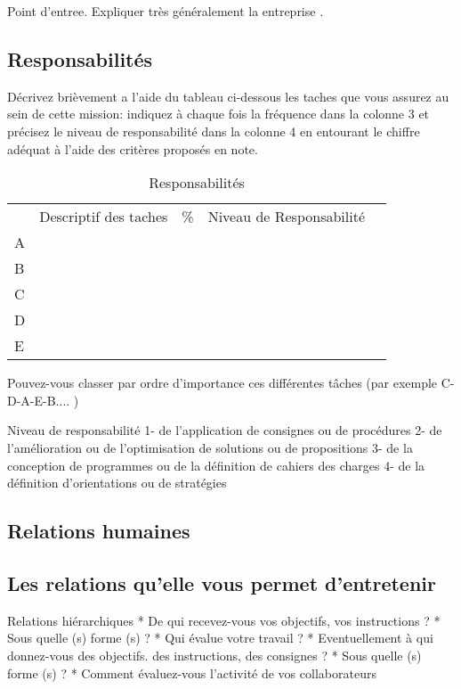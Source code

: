 \documentclass{resume} %
\begin{document}
	Point d'entree. Expliquer très généralement la entreprise .
	
	\subsection{Responsabilités}

Décrivez brièvement a l'aide du tableau ci-dessous les taches que vous assurez au sein de cette mission: indiquez à chaque fois la fréquence dans la colonne 3 et précisez le niveau de responsabilité dans la colonne 4 en entourant le chiffre adéquat à l'aide des critères proposés en note.
\begin{table}[!htbp]
\label{my-label}
\begin{tabular}{|l|l|l|l|l}
\cline{1-4}
   & Descriptif des taches &  \% & Niveau de
Responsabilité  &  \\ \cline{1-4}
 A&  &  &  &  \\ \cline{1-4}
 B&  &  &  &  \\ \cline{1-4}
 C&  &  &  &  \\ \cline{1-4}
 D&  &  &  &  \\ \cline{1-4}
 E&  &  &  &  \\ \cline{1-4}
\end{tabular}
\caption{Responsabilités}
\end{table}

Pouvez-vous classer par ordre d'importance ces différentes tâches (par exemple C-D-A-E-B.... )

Niveau de responsabilité
1- de l'application de consignes ou de procédures
2- de l'amélioration ou de l'optimisation de solutions ou de propositions
3- de la conception de programmes ou de la définition de cahiers des charges 
4- de la définition d'orientations ou de stratégies

	\subsection{Relations humaines}
	
		\subsection{Les relations qu'elle vous permet d'entretenir}
Relations hiérarchiques
* De qui recevez-vous vos objectifs, vos instructions ?
* Sous quelle (s) forme (s) ?
* Qui évalue votre travail ?
* Eventuellement à qui donnez-vous des objectifs. des instructions, des consignes ?
* Sous quelle (s) forme (s) ?
* Comment évaluez-vous l'activité de vos collaborateurs
\end{document}
